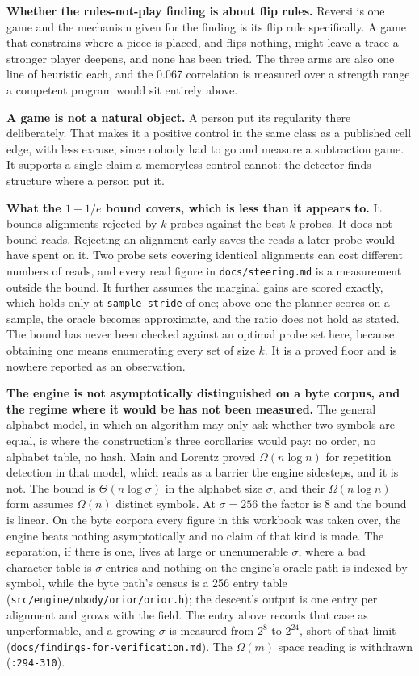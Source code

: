 \textbf{Whether the rules-not-play finding is about flip rules.} Reversi is one game and the mechanism given for the finding is its flip rule specifically. A game that constrains where a piece is placed, and flips nothing, might leave a trace a stronger player deepens, and none has been tried. The three arms are also one line of heuristic each, and the 0.067 correlation is measured over a strength range a competent program would sit entirely above.

\textbf{A game is not a natural object.} A person put its regularity there deliberately. That makes it a positive control in the same class as a published cell edge, with less excuse, since nobody had to go and measure a subtraction game. It supports a single claim a memoryless control cannot: the detector finds structure where a person put it.

\textbf{What the \(1 - 1/e\) bound covers, which is less than it appears to.} It bounds alignments rejected by \(k\) probes against the best \(k\) probes. It does not bound reads. Rejecting an alignment early saves the reads a later probe would have spent on it. Two probe sets covering identical alignments can cost different numbers of reads, and every read figure in \texttt{docs/\allowbreak{}steering.md} is a measurement outside the bound. It further assumes the marginal gains are scored exactly, which holds only at \texttt{sample\_stride} of one; above one the planner scores on a sample, the oracle becomes approximate, and the ratio does not hold as stated. The bound has never been checked against an optimal probe set here, because obtaining one means enumerating every set of size \(k\). It is a proved floor and is nowhere reported as an observation.

\textbf{The engine is not asymptotically distinguished on a byte corpus, and the regime where it would be has not been measured.} The general alphabet model, in which an algorithm may only ask whether two symbols are equal, is where the construction's three corollaries would pay: no order, no alphabet table, no hash. Main and Lorentz proved \(\Omega(n \log n)\) for repetition detection in that model, which reads as a barrier the engine sidesteps, and it is not. The bound is \(\Theta(n \log \sigma)\) in the alphabet size \(\sigma\), and their \(\Omega(n \log n)\) form assumes \(\Omega(n)\) distinct symbols. At \(\sigma = 256\) the factor is 8 and the bound is linear. On the byte corpora every figure in this workbook was taken over, the engine beats nothing asymptotically and no claim of that kind is made. The separation, if there is one, lives at large or unenumerable \(\sigma\), where a bad character table is \(\sigma\) entries and nothing on the engine's oracle path is indexed by symbol, while the byte path's census is a 256 entry table (\texttt{src/\allowbreak{}engine/\allowbreak{}nbody/\allowbreak{}orior/\allowbreak{}orior.h}); the descent's output is one entry per alignment and grows with the field. The entry above records that case as unperformable, and a growing \(\sigma\) is measured from \(2^8\) to \(2^{24}\), short of that limit (\texttt{docs/\allowbreak{}findings-\allowbreak{}for-\allowbreak{}verification.md}). The \(\Omega(m)\) space reading is withdrawn (\texttt{:294-310}).

